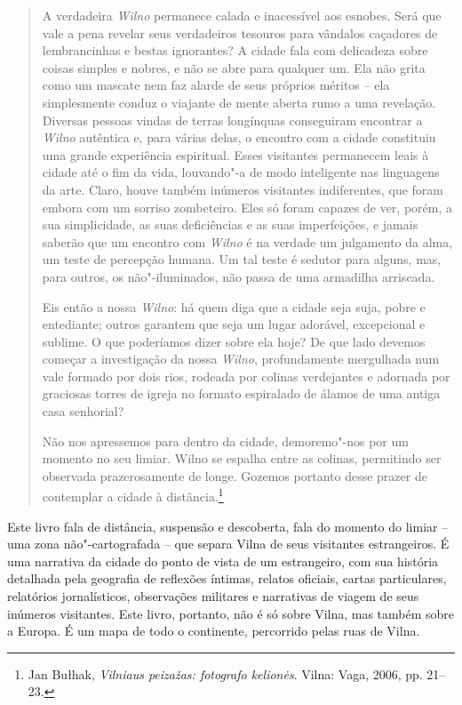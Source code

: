 \begin{quote}
A verdadeira \textit{Wilno} permanece calada e inacessível aos esnobes. Será que
vale a pena revelar seus verdadeiros tesouros para vândalos caçadores de
lembrancinhas e bestas ignorantes? A cidade fala com delicadeza sobre
coisas simples e nobres, e não se abre para qualquer um. Ela não grita
como um mascate nem faz alarde de seus próprios méritos -- ela
simplesmente conduz o viajante de mente aberta rumo a uma revelação.
Diversas pessoas vindas de terras longínquas conseguiram encontrar a
\textit{Wilno} autêntica e, para várias delas, o encontro com a cidade constituiu
uma grande experiência espiritual. Esses visitantes permanecem leais à
cidade até o fim da vida, louvando"-a de modo inteligente nas linguagens
da arte. Claro, houve também inúmeros visitantes indiferentes, que foram
embora com um sorriso zombeteiro. Eles só foram capazes de ver, porém, a
sua simplicidade, as suas deficiências e as suas imperfeições, e jamais
saberão que um encontro com \textit{Wilno} é na verdade um julgamento da alma, um
teste de percepção humana. Um tal teste é sedutor para alguns, mas, para
outros, os não"-iluminados, não passa de uma armadilha arriscada.

Eis então a nossa \textit{Wilno}: há quem diga que a cidade seja suja, pobre e
entediante; outros garantem que seja um lugar adorável, excepcional e
sublime. O que poderíamos dizer sobre ela hoje? De que lado devemos
começar a investigação da nossa \textit{Wilno}, profundamente mergulhada num vale
formado por dois rios, rodeada por colinas verdejantes e adornada por
graciosas torres de igreja no formato espiralado de álamos de uma antiga
casa senhorial?

Não nos apressemos para dentro da cidade, demoremo"-nos por um momento no
seu limiar. Wilno se espalha entre as colinas, permitindo ser observada
prazerosamente de longe. Gozemos portanto desse prazer de contemplar a
cidade à distância.\footnote{Jan Bułhak, \textit{Vilniaus peizažas: fotografo kelionės}. Vilna: Vaga, 2006, pp. 21--23.}
\end{quote}

\asterisc

Este livro fala de distância, suspensão e descoberta, fala do momento do
limiar -- uma zona não"-cartografada -- que separa Vilna de seus visitantes
estrangeiros. É uma narrativa da cidade do ponto de vista de um
estrangeiro, com sua história detalhada pela geografia de reflexões
íntimas, relatos oficiais, cartas particulares, relatórios
jornalísticos, observações militares e narrativas de viagem de seus
inúmeros visitantes. Este livro, portanto, não é só sobre Vilna, mas
também sobre a Europa. É um mapa de todo o continente, percorrido pelas
ruas de Vilna.

